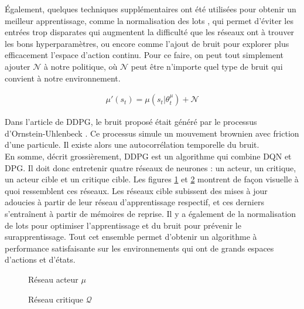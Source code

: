 \documentclass[letterpaper, french]{article}
\begin{document}
Également, quelques techniques supplémentaires ont été utilisées pour obtenir un meilleur apprentissage, comme la normalisation des lots \cite{batch-norm}, qui permet d'éviter les entrées trop disparates qui augmentent la difficulté que les réseaux ont à trouver les bons hyperparamètres, ou encore comme l'ajout de bruit pour explorer plus efficacement l'espace d'action continu. Pour ce faire, on peut tout simplement ajouter $\mathcal{N}$ à notre politique, où $\mathcal{N}$ peut être n'importe quel type de bruit qui convient à notre environnement.
\begingroup
\begin{center}
\begin{equation}\label{eq:bruit}
\begin{split}
\mu\prime(s_t) = \mu(s_t|\theta_{t}^{\mu}) + \mathcal{N}
\end{split}
\end{equation}
\end{center}
\endgroup
Dans l'article de DDPG, le bruit proposé était généré par le processus d'Ornstein-Uhlenbeck \cite{ornstein-uhlenbeck}. Ce processus simule un mouvement brownien avec friction d'une particule. Il existe alors une autocorrélation temporelle du bruit. \\

En somme, décrit grossièrement, DDPG est un algorithme qui combine DQN et DPG. Il doit donc entretenir quatre réseaux de neurones : un acteur, un critique, un acteur cible et un critique cible. Les figures \ref{fig:reseau_acteur} et \ref{fig:reseau_critique} montrent de façon visuelle à quoi ressemblent ces réseaux. Les réseaux cible subissent des mises à jour adoucies à partir de leur réseau d'apprentissage respectif, et ces derniers s'entraînent à partir de mémoires de reprise. Il y a également de la normalisation de lots pour optimiser l'apprentissage et du bruit pour prévenir le surapprentissage. Tout cet ensemble permet d'obtenir un algorithme à performance satisfaisante sur les environnements qui ont de grands espaces d'actions et d'états.

\begin{figure}
\begin{center}
 
\caption{Réseau acteur $\mu$}
\label{fig:reseau_acteur}
\end{center}
\end{figure}

\begin{figure}
\begin{center}
 
\caption{Réseau critique $\mathcal{Q}$}
\label{fig:reseau_critique}
\end{center}
\end{figure}
\end{document}
